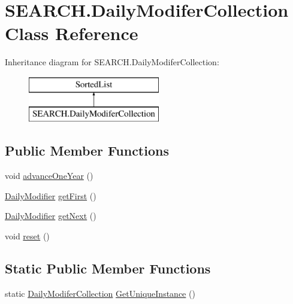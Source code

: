 \hypertarget{class_s_e_a_r_c_h_1_1_daily_modifer_collection}{\section{S\-E\-A\-R\-C\-H.\-Daily\-Modifer\-Collection Class Reference}
\label{class_s_e_a_r_c_h_1_1_daily_modifer_collection}
}
Inheritance diagram for S\-E\-A\-R\-C\-H.\-Daily\-Modifer\-Collection\-:\begin{figure}[H]
\begin{center}
\leavevmode
\includegraphics[height=2.000000cm]{class_s_e_a_r_c_h_1_1_daily_modifer_collection}
\end{center}
\end{figure}
\subsection*{Public Member Functions}
\begin{DoxyCompactItemize}
\item 
void \hyperlink{class_s_e_a_r_c_h_1_1_daily_modifer_collection_ad052873914fa09b8bbe3ce3b5086b67c}{advance\-One\-Year} ()
\item 
\hyperlink{class_s_e_a_r_c_h_1_1_daily_modifier}{Daily\-Modifier} \hyperlink{class_s_e_a_r_c_h_1_1_daily_modifer_collection_aff8c3bb772244fc60237f822b93813bc}{get\-First} ()
\item 
\hyperlink{class_s_e_a_r_c_h_1_1_daily_modifier}{Daily\-Modifier} \hyperlink{class_s_e_a_r_c_h_1_1_daily_modifer_collection_ad033612ae50c83785af234f8581ef89c}{get\-Next} ()
\item 
void \hyperlink{class_s_e_a_r_c_h_1_1_daily_modifer_collection_a2bc12bb09a1377704a13af5182c69c92}{reset} ()
\end{DoxyCompactItemize}
\subsection*{Static Public Member Functions}
\begin{DoxyCompactItemize}
\item 
static \hyperlink{class_s_e_a_r_c_h_1_1_daily_modifer_collection}{Daily\-Modifer\-Collection} \hyperlink{class_s_e_a_r_c_h_1_1_daily_modifer_collection_af537ec884ee1035a37b73793ce9c71d2}{Get\-Unique\-Instance} ()
\end{DoxyCompactItemize}
